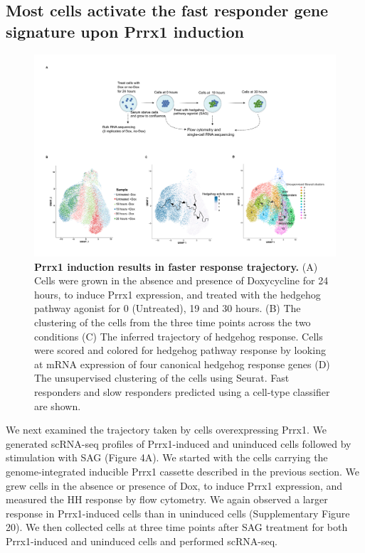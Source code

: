 \subsection{Most cells activate the fast responder gene signature upon Prrx1 induction}
\begin{figure}[t!]  
    \centering
    \includegraphics[width=\linewidth]{figures/hedgehog/hh_figure4.png}
    \caption[Prrx1 induction results in faster response trajectory.]{%
        \textbf{Prrx1 induction results in faster response trajectory.} (A) Cells were grown in the absence and presence of Doxycycline for 24 hours, to induce Prrx1 expression, and treated with the hedgehog pathway agonist for 0 (Untreated), 19 and 30 hours. (B) The clustering of the cells from the three time points across the two conditions (C) The inferred trajectory of hedgehog response. Cells were scored and colored for hedgehog pathway response by looking at mRNA expression of four canonical hedgehog response genes (D) The unsupervised clustering of the cells using Seurat. Fast responders and slow responders predicted using a cell-type classifier are shown.
    }
    \label{fig:hh_figure4}
\end{figure}
We next examined the trajectory taken by cells overexpressing Prrx1. We generated scRNA-seq profiles of Prrx1-induced and uninduced cells followed by stimulation with SAG (Figure 4A). We started with the cells carrying the genome-integrated inducible Prrx1 cassette described in the previous section. We grew cells in the absence or presence of Dox, to induce Prrx1 expression, and measured the HH response by flow cytometry. We again observed a larger response in Prrx1-induced cells than in uninduced cells (Supplementary Figure 20). We then collected cells at three time points after SAG treatment for both Prrx1-induced and uninduced cells and performed scRNA-seq.

